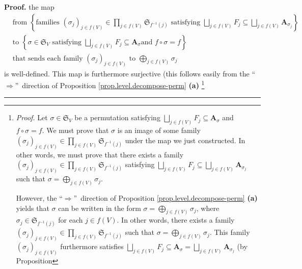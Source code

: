 \documentclass[numbers=enddot,12pt,final,onecolumn,notitlepage]{scrartcl}%
\numberwithin{exer}{section}
\theoremstyle{definition}
\newenvironment{proof}[1][Proof]{\noindent\textbf{#1.} }{\ \rule{0.5em}{0.5em}}
\let\prodnonlimits\prod
\let\sqcupnonlimits\bigsqcup
\let\oplusnonlimits\bigoplus
\renewcommand{\prod}{\prodnonlimits\limits}
\renewcommand{\bigsqcup}{\sqcupnonlimits\limits}
\renewcommand{\bigoplus}{\oplusnonlimits\limits}
\newenvironment{verlong}{}{}
\begin{document}
\begin{verlong}
\begin{proof}
the map
\begin{align*}
&  \text{from }\left\{  \text{families }\left(  \sigma_{j}\right)  _{j\in
f\left(  V\right)  }\in\prod_{j\in f\left(  V\right)  }\mathfrak{S}%
_{f^{-1}\left(  j\right)  }\text{ satisfying }\bigsqcup_{j\in f\left(
V\right)  }F_{j}\subseteq\bigsqcup_{j\in f\left(  V\right)  }\mathbf{A}%
_{\sigma_{j}}\right\} \\
&  \text{to }\left\{  \sigma\in\mathfrak{S}_{V}\text{ satisfying }%
\bigsqcup_{j\in f\left(  V\right)  }F_{j}\subseteq\mathbf{A}_{\sigma}\text{
and }f\circ\sigma=f\right\} \\
&  \text{that sends each family }\left(  \sigma_{j}\right)  _{j\in f\left(
V\right)  }\text{ to }\bigoplus_{j\in f\left(  V\right)  }\sigma_{j}%
\end{align*}
is well-defined. This map is furthermore surjective (this follows easily from
the \textquotedblleft$\Longrightarrow$\textquotedblright\ direction of
Proposition \ref{prop.level.decompose-perm} \textbf{(a)}%
\footnote{\textit{Proof.} Let $\sigma\in\mathfrak{S}_{V}$ be a permutation
satisfying $\bigsqcup_{j\in f\left(  V\right)  }F_{j}\subseteq\mathbf{A}%
_{\sigma}$ and $f\circ\sigma=f$. We must prove that $\sigma$ is an image of
some family $\left(  \sigma_{j}\right)  _{j\in f\left(  V\right)  }\in
\prod_{j\in f\left(  V\right)  }\mathfrak{S}_{f^{-1}\left(  j\right)  }$ under
the map we just constructed. In other words, we must prove that there exists a
family $\left(  \sigma_{j}\right)  _{j\in f\left(  V\right)  }\in\prod_{j\in
f\left(  V\right)  }\mathfrak{S}_{f^{-1}\left(  j\right)  }$ satisfying
$\bigsqcup_{j\in f\left(  V\right)  }F_{j}\subseteq\bigsqcup_{j\in f\left(
V\right)  }\mathbf{A}_{\sigma_{j}}$ such that $\sigma=\bigoplus_{j\in f\left(
V\right)  }\sigma_{j}$.
\par
However, the \textquotedblleft$\Longrightarrow$\textquotedblright\ direction
of Proposition \ref{prop.level.decompose-perm} \textbf{(a)} yields that
$\sigma$ can be written in the form $\sigma=\bigoplus_{j\in f\left(  V\right)
}\sigma_{j}$, where $\sigma_{j}\in\mathfrak{S}_{f^{-1}\left(  j\right)  }$ for
each $j\in f\left(  V\right)  $. In other words, there exists a family
$\left(  \sigma_{j}\right)  _{j\in f\left(  V\right)  }\in\prod_{j\in f\left(
V\right)  }\mathfrak{S}_{f^{-1}\left(  j\right)  }$ such that $\sigma
=\bigoplus_{j\in f\left(  V\right)  }\sigma_{j}$. This family $\left(
\sigma_{j}\right)  _{j\in f\left(  V\right)  }$ furthermore satisfies
$\bigsqcup_{j\in f\left(  V\right)  }F_{j}\subseteq\mathbf{A}_{\sigma
}=\bigsqcup_{j\in f\left(  V\right)  }\mathbf{A}_{\sigma_{j}}$ (by Proposition
}
\end{proof}
\end{verlong}
\end{document}
